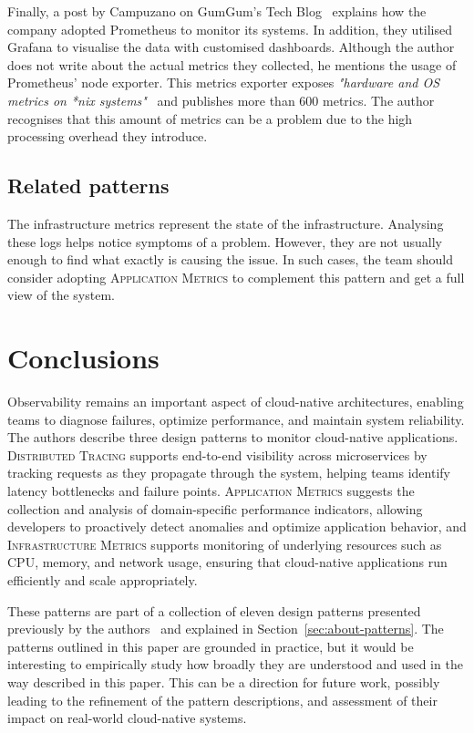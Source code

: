 \documentclass[runningheads]{llncs}
\begin{document}
Finally, a post by Campuzano on GumGum's Tech Blog~\cite{Campuzano-2019} explains how the company adopted Prometheus to monitor its systems. In addition, they utilised Grafana to visualise the data with customised dashboards. Although the author does not write about the actual metrics they collected, he mentions the usage of Prometheus' node exporter. This metrics exporter exposes \textit{"hardware and OS metrics on *nix systems"}~\cite{Campuzano-2019} and publishes more than 600 metrics. The author recognises that this amount of metrics can be a problem due to the high processing overhead they introduce.

\subsection{Related patterns}
The infrastructure metrics represent the state of the infrastructure. Analysing these logs helps notice symptoms of a problem. However, they are not usually enough to find what exactly is causing the issue. In such cases, the team should consider adopting \textsc{Application Metrics} to complement this pattern and get a full view of the system.



\section{Conclusions}\label{sec:conclusions}

Observability remains an important aspect of cloud-native architectures, enabling teams to diagnose failures, optimize performance, and maintain system reliability. The authors describe three design patterns to monitor cloud-native applications. \textsc{Distributed Tracing} supports end-to-end visibility across microservices by tracking requests as they propagate through the system, helping teams identify latency bottlenecks and failure points. \textsc{Application Metrics} suggests the collection and analysis of domain-specific performance indicators, allowing developers to proactively detect anomalies and optimize application behavior, and \textsc{Infrastructure Metrics} supports monitoring of underlying resources such as CPU, memory, and network usage, ensuring that cloud-native applications run efficiently and scale appropriately. 

These patterns are part of a collection of eleven design patterns presented previously by the authors~\cite{Albuquerque-Thesis-2022} and explained in Section~\ref{sec:about-patterns}. The patterns outlined in this paper are grounded in practice, but it would be interesting to empirically study how broadly they are understood and used in the way described in this paper. This can be a direction for future work, possibly leading to the refinement of the pattern descriptions, and assessment of their impact on real-world cloud-native systems.  
\end{document}

